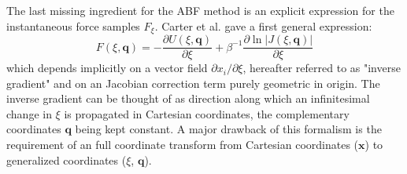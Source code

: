 The last missing ingredient for the ABF method is an explicit expression for the instantaneous force samples $F_{\xi}$. Carter et al.\autocite{carter1989constrained} gave a first general expression:
\begin{equation}
  F(\xi,\textbf{q}) = -\frac{\partial U(\xi,\textbf{q})}{\partial \xi} + \beta^{-1} \frac{\partial \ln|J(\xi,\textbf{q})|}{\partial\xi} \label{eq:instforce old}
\end{equation}
which depends implicitly on a vector field $\partial x_i / \partial \xi$, hereafter referred to as "inverse gradient" and on an Jacobian correction term purely geometric in origin. The inverse gradient can be thought of as direction along which an infinitesimal change in $\xi$ is propagated in Cartesian coordinates, the complementary coordinates $\textbf{q}$ being kept constant. A major drawback of this formalism is the requirement of an full coordinate transform from Cartesian coordinates ($\textbf{x}$) to generalized coordinates ($\xi$, $\textbf{q}$).

